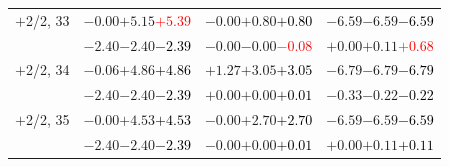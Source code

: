\documentclass[compress]{beamer}
\begin{document}
\begin{frame}
\begin{tabular}{r | c | c | c}
$+$2/2, 33 & $-0.00$\hspace{0.1 cm}$+5.15$\hspace{0.1 cm}\textcolor{red}{$+5.39$} & $-0.00$\hspace{0.1 cm}$+0.80$\hspace{0.1 cm}\textcolor{black}{$+0.80$} & $-6.59$\hspace{0.1 cm}$-6.59$\hspace{0.1 cm}\textcolor{black}{$-6.59$} \\
           & $-2.40$\hspace{0.1 cm}$-2.40$\hspace{0.1 cm}\textcolor{black}{$-2.39$} & $-0.00$\hspace{0.1 cm}$-0.00$\hspace{0.1 cm}\textcolor{red}{$-0.08$} & $+0.00$\hspace{0.1 cm}$+0.11$\hspace{0.1 cm}\textcolor{red}{$+0.68$} \\
$+$2/2, 34 & $-0.06$\hspace{0.1 cm}$+4.86$\hspace{0.1 cm}\textcolor{black}{$+4.86$} & $+1.27$\hspace{0.1 cm}$+3.05$\hspace{0.1 cm}\textcolor{black}{$+3.05$} & $-6.79$\hspace{0.1 cm}$-6.79$\hspace{0.1 cm}\textcolor{black}{$-6.79$} \\
           & $-2.40$\hspace{0.1 cm}$-2.40$\hspace{0.1 cm}\textcolor{black}{$-2.39$} & $+0.00$\hspace{0.1 cm}$+0.00$\hspace{0.1 cm}\textcolor{black}{$+0.01$} & $-0.33$\hspace{0.1 cm}$-0.22$\hspace{0.1 cm}\textcolor{black}{$-0.22$} \\
$+$2/2, 35 & $-0.00$\hspace{0.1 cm}$+4.53$\hspace{0.1 cm}\textcolor{black}{$+4.53$} & $-0.00$\hspace{0.1 cm}$+2.70$\hspace{0.1 cm}\textcolor{black}{$+2.70$} & $-6.59$\hspace{0.1 cm}$-6.59$\hspace{0.1 cm}\textcolor{black}{$-6.59$} \\
           & $-2.40$\hspace{0.1 cm}$-2.40$\hspace{0.1 cm}\textcolor{black}{$-2.39$} & $-0.00$\hspace{0.1 cm}$+0.00$\hspace{0.1 cm}\textcolor{black}{$+0.01$} & $+0.00$\hspace{0.1 cm}$+0.11$\hspace{0.1 cm}\textcolor{black}{$+0.11$} \\

\end{tabular}
\end{frame}
\end{document}
